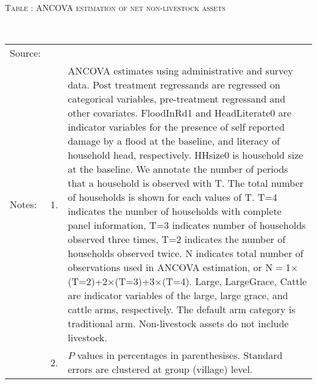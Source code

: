 \hspace{-1cm}\begin{minipage}[t]{14cm}
\hfil\textsc{\normalsize Table \thetable: ANCOVA estimation of net non-livestock assets\label{tab ANCOVA NetNLAssets}}\\
\setlength{\tabcolsep}{1pt}
\setlength{\baselineskip}{8pt}
\renewcommand{\arraystretch}{.55}
\hfil{}\\
\renewcommand{\arraystretch}{.8}
\setlength{\tabcolsep}{1pt}
\begin{tabular}{>{\hfill\scriptsize}p{1cm}<{}>{\hfill\scriptsize}p{.25cm}<{}>{\scriptsize}p{12cm}<{\hfill}}
Source:& \multicolumn{2}{l}{\scriptsize Estimated with GUK administrative and survey data.}\\
Notes: & 1. & ANCOVA estimates using administrative and survey data. Post treatment regressands are regressed on categorical variables, pre-treatment regressand and other covariates. \textsf{FloodInRd1} and \textsf{HeadLiterate0} are indicator variables for the presence of self reported damage by a flood at the baseline, and literacy of household head, respectively. \textsf{HHsize0} is household size at the baseline. We annotate the number of periods that a household is observed with \textsf{T}. The total number of households is shown for each values of \textsf{T}. \textsf{T=4} indicates the number of households with complete panel information, \textsf{T=3} indicates number of households observed three times, \textsf{T=2} indicates the number of households observed twice. \textsf{N} indicates total number of observations used in ANCOVA estimation, or \textsf{N$=$1$\times$(T=2)+2$\times$(T=3)+3$\times$(T=4)}.  \textsf{Large}, \textsf{LargeGrace}, \textsf{Cattle} are indicator variables of the \textsf{large}, \textsf{large grace}, and \textsf{cattle} arms, respectively. The default arm category is \textsf{traditional} arm. Non-livestock assets do not include livestock. \\
& 2. & $P$ values in percentages in parenthesises. Standard errors are clustered at group (village) level.
\end{tabular}
\end{minipage}


